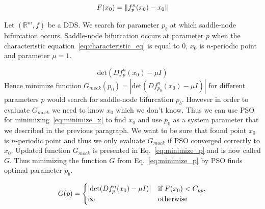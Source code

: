 \begin{equation}
\label{eq:minimize_x}
    F(x_0) = \lVert f^{n}_{p}(x_0)-x_0\rVert
\end{equation}

\par
Let $(\mathbb{R}^{m}, f)$ be a DDS.
We search for parameter $p_b$ at which saddle-node bifurcation occurs.
Saddle-node bifurcation occurs at parameter $p$ when the characteristic equation~\ref{eq:characteristic_eq} is equal to $0$, $x_0$ is $n$-periodic point and parameter $\mu = 1$.

\begin{equation}
\label{eq:characteristic_eq}
        \text{det}(Df^{n}_{p}(x_0)-\mu I)
\end{equation}
Hence minimize function $G_{mock}(p_0) = |\text{det}(Df^{n}_{p_0}(x_0)-\mu I)|$ for different parameters $p$ would search for saddle-node bifurcation $p_b$.
However in order to evaluate $G_{mock}$ we need to know $x_0$ which we don't know.
Thus we can use PSO for minimizing~\ref{eq:minimize_x} to find $x_0$ and use $p_0$ as a system parameter that we described in the previous paragraph.
We want to be sure that found point $x_0$ is $n$-periodic point and thus we only evaluate $G_{mock}$ if PSO converged correctly to $x_0$.
Updated function $G_{mock}$ is presented in Eq.~\ref{eq:minimize_p} and is now called $G$.
Thus minimizing the function $G$ from Eq.~\ref{eq:minimize_p} by PSO finds optimal parameter $p_b$.

\begin{equation}
\label{eq:minimize_p}
    G(p) =
    \begin{cases}
        |\text{det}(Df^{n}_{p}(x_0)-\mu I)| & \text{if } F(x_0) < C_{pp}, \\
        \infty & \rm{otherwise}
    \end{cases}
\end{equation}

